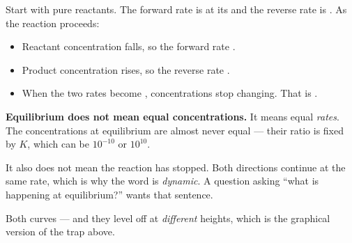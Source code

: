 \documentclass{apchem-notes}
\begin{document}
Start with pure reactants. The forward rate is at its
 and the reverse rate is
. As the reaction proceeds:

\begin{itemize}[leftmargin=*,itemsep=0.3em]
  \item Reactant concentration falls, so the forward rate
        .
  \item Product concentration rises, so the reverse rate
        .
  \item When the two rates become , concentrations
        stop changing. That is .
\end{itemize}

\begin{apctrap}
\textbf{Equilibrium does not mean equal concentrations.} It means equal
\emph{rates}. The concentrations at equilibrium are almost never equal ---
their ratio is fixed by $K$, which can be $10^{-10}$ or $10^{10}$.

It also does not mean the reaction has stopped. Both directions continue at
the same rate, which is why the word is \emph{dynamic}. A question asking
``what is happening at equilibrium?'' wants that sentence.
\end{apctrap}

\begin{center}
\end{center}

Both curves  --- and they level off at
\emph{different} heights, which is the graphical version of the trap above.

\end{document}
